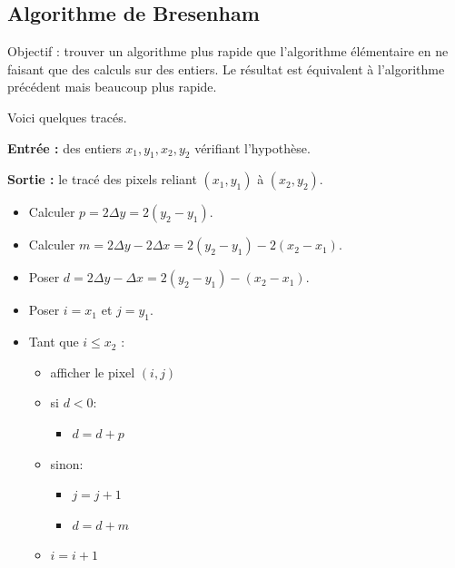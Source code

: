 \documentclass[11pt,class=report,crop=false]{standalone}
\begin{document}
 

\subsection{Algorithme de Bresenham}


Objectif : trouver un algorithme plus rapide que l'algorithme élémentaire en ne faisant que des calculs sur des entiers. Le résultat est équivalent à l'algorithme précédent mais beaucoup plus rapide.

Voici quelques tracés.



\begin{algorithme}

\textbf{Entrée :} des entiers $x_1, y_1, x_2, y_2$ vérifiant l'hypothèse.

\textbf{Sortie :} le tracé des pixels reliant $(x_1,y_1)$ à $(x_2,y_2)$.

\begin{itemize}
	\item Calculer $p = 2\Delta y = 2(y_2-y_1)$.
	\item Calculer $m = 2\Delta y - 2 \Delta x = 2(y_2-y_1) -2(x_2-x_1)$.
	\item Poser $d = 2\Delta y - \Delta x = 2(y_2-y_1) - (x_2-x_1)$.
	
	\item Poser $i = x_1$ et $j = y_1$.
	
	\item Tant que $i \le x_2$ :
	\begin{itemize}
		\item afficher le pixel $(i,j)$
		
		\item 
		si $d < 0$:
		    \begin{itemize}
			\item $d = d+p$
			\end{itemize}
		\item sinon:
		    \begin{itemize}		
			\item $j=j+1$ 
			\item $d=d+m$	
			\end{itemize}					
		\item $i = i + 1$
	\end{itemize}
\end{itemize}
\end{algorithme}
\end{document}
